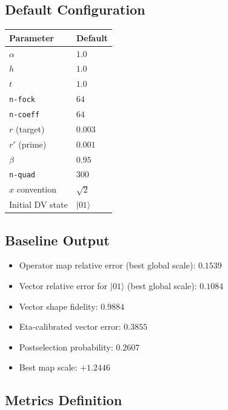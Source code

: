 \documentclass[11pt]{article}
\begin{document}
\subsection{Default Configuration}

\begin{center}
\begin{tabular}{ll}
  \toprule
  Parameter & Default \\
  \midrule
  $\alpha$ & $1.0$ \\
  $h$ & $1.0$ \\
  $t$ & $1.0$ \\
  \texttt{n-fock} & $64$ \\
  \texttt{n-coeff} & $64$ \\
  $r$ (target) & $0.003$ \\
  $r'$ (prime) & $0.001$ \\
  $\beta$ & $0.95$ \\
  \texttt{n-quad} & $300$ \\
  $\hat{x}$ convention & $\sqrt{2}$ \\
  Initial DV state & $|01\rangle$ \\
  \bottomrule
\end{tabular}
\end{center}

\subsection{Baseline Output}

\begin{itemize}[itemsep=2pt]
  \item Operator map relative error (best global scale): $0.1539$
  \item Vector relative error for $|01\rangle$ (best global scale): $0.1084$
  \item Vector shape fidelity: $0.9884$
  \item Eta-calibrated vector error: $0.3855$
  \item Postselection probability: $0.2607$
  \item Best map scale: $+1.2446$
\end{itemize}

\subsection{Metrics Definition}
\end{document}
